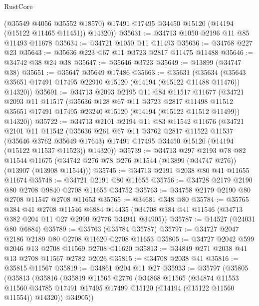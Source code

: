\begin{lexlean}{RustCore}
\begin{coremodule}
        (@35549 @4056 @35552 @18570)
        @17491
        @17495
        @34450
        @15120
        (@14194 (@15122 @11465 @11451))
        @14320))
@35631 := @34713 @1050 @2196 @11 @85 @11493 @11678
@35634 := @34721 @1050 @11 @11493
@35636 := @34768 @227 @23
@35643 := @35636 @223 @67 @11 @3723 @2817 @11475 @11488
@35646 := @34742 @38 @24 @38
@35647 := @35646 @3723
@35649 := @13899 (@34747 @38)
@35651 := @35647 @35649 @17486
@35663 := @35631
    (@35634 (@35643 @35651 @17491 @17495 @22910 @15120 (@14194 (@15122 @11488 @11476)) @14320))
@35691 := @34713
    @2093
    @2195
    @11
    @84
    @11517
    @11677
    (@34721
      @2093
      @11
      @11517
      (@35636
        @128
        @67
        @11
        @3723
        @2817
        @11498
        @11512
        @35651
        @17491
        @17495
        @23240
        @15120
        (@14194 (@15122 @11512 @11499))
        @14320))
@35722 := @34713
    @2101
    @2194
    @11
    @83
    @11542
    @11676
    (@34721
      @2101
      @11
      @11542
      (@35636
        @261
        @67
        @11
        @3762
        @2817
        @11522
        @11537
        (@35646 @3762 @35649 @17643)
        @17491
        @17495
        @34450
        @15120
        (@14194 (@15122 @11537 @11523))
        @14320))
@35739 := @34713
    @297
    @2193
    @78
    @82
    @11544
    @11675
    (@34742 @276 @78 @276 @11544 (@13899 (@34747 @276)) (@13907 (@13908 @11544)))
@35745 := @34713 @2191 @2038 @80 @41 @11655 @11674
@35748 := @34721 @2191 @80 @11655
@35756 := @34728 @2179 @2190 @80 @2708 @9840 @2708 @11655 @34752
@35763 := @34758 @2179 @2190 @80 @2708 @11547 @2708 @11653
@35765 := @34681 @348 @80
@35784 := @35765
    @384
    @41
    @2708
    @11546
    @6884
    @14435
    (@34708 @384 @41 @11546 (@34713 @382 @204 @11 @27 @2990 @2776 @34941 @34905))
@35787 := @14527 (@24031 @80 @6884)
@35789 := @35763 (@35784 @35787)
@35797 := @34727 @2047 @2186 @2189 @80 @2708 @11620 @2708 @11653
@35805 := @34727 @2042 @599 @2046 @13 @2708 @11569 @2708 @11620
@35813 := @34849 @271 @2038 @41 @13 @2708 @11567 @2782 @2026
@35815 := @34708 @2038 @41
@35816 := @35815 @11567
@35819 := @34861 @204 @11 @27
@35933 := @35797
    (@35805
      (@35813
        (@35816
          (@35819
            @11565
            @2776
            (@34868
              @11565
              (@34874
                @11553
                @11560
                @34785
                @17491
                @17495
                @17499
                @15120
                (@14194 (@15122 @11560 @11554))
                @14320))
            @34905))

\end{coremodule}
\end{lexlean}
